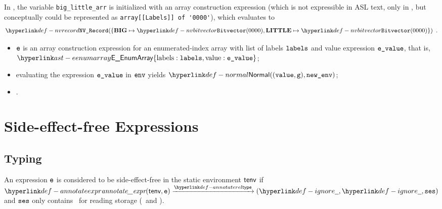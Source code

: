 In ,
the variable \verb|big_little_arr| is initialized with an array construction expression
(which is not expressible in ASL text, only in \typedast, but conceptually could be
represented as \verb|array[[Labels]] of '0000'|),
which evaluates to
\[
\nvrecord{\{\vBIG\mapsto\nvbitvector(0000), \vLITTLE\mapsto\nvbitvector(0000)\}} \enspace.
\]

\ProseParagraph
\AllApply
\begin{itemize}
  \item $\ve$ is an array construction expression for an enumerated-index array with
        list of labels $\vlabels$ and value expression $\evalue$,
        that is, \\
        $\EEnumArray\{\EArrayLabels: \vlabels, \EArrayValue: \evalue\}$;
  \item evaluating the expression $\evalue$ in $\env$ yields $\Normal((\vvalue, \vg), \newenv)$\ProseOrAbnormal;
  \item {}.
\end{itemize}

\FormallyParagraph
\begin{mathpar}
\end{mathpar}


\section{Side-effect-free Expressions\label{sec:SideEffectFreeExpressions}}
\subsection{Typing}
An expression $\ve$ is considered to be side-effect-free in the static environment $\tenv$
if $\annotateexpr{\tenv, \ve} \typearrow (\Ignore, \Ignore, \vses)$
and $\vses$ only contains \sideeffectdescriptorsterm\ for reading storage (\ReadLocal\ and \ReadGlobal).

